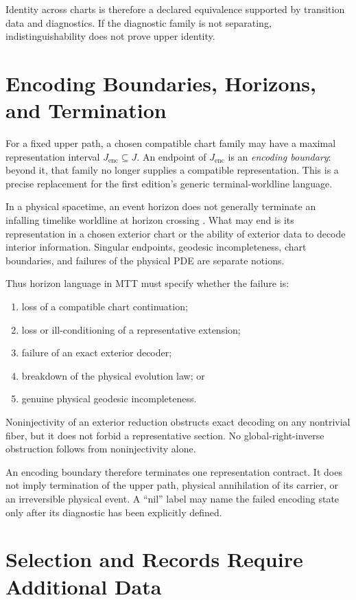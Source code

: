 \documentclass[11pt]{article}
\begin{document}
Identity across charts is therefore a declared equivalence supported by
transition data and diagnostics. If the diagnostic family is not separating,
indistinguishability does not prove upper identity.

\section{Encoding Boundaries, Horizons, and Termination}

For a fixed upper path, a chosen compatible chart family may have a maximal
representation interval $J_{\mathrm{enc}}\subseteq J$. An endpoint of
$J_{\mathrm{enc}}$ is an \emph{encoding boundary}: beyond it, that family no
longer supplies a compatible representation. This is a precise replacement
for the first edition's generic terminal-worldline language.

In a physical spacetime, an event horizon does not generally terminate an
infalling timelike worldline at horizon crossing \cite{Wald}. What may end is
its representation in a chosen exterior chart or the ability of exterior data
to decode interior information. Singular endpoints, geodesic incompleteness,
chart boundaries, and failures of the physical PDE are separate notions.

Thus horizon language in MTT must specify whether the failure is:
\begin{enumerate}
\item loss of a compatible chart continuation;
\item loss or ill-conditioning of a representative extension;
\item failure of an exact exterior decoder;
\item breakdown of the physical evolution law; or
\item genuine physical geodesic incompleteness.
\end{enumerate}

Noninjectivity of an exterior reduction obstructs exact decoding on any
nontrivial fiber, but it does not forbid a representative section. No
global-right-inverse obstruction follows from noninjectivity alone.

An encoding boundary therefore terminates one representation contract. It does
not imply termination of the upper path, physical annihilation of its carrier,
or an irreversible physical event. A ``nil'' label may name the failed
encoding state only after its diagnostic has been explicitly defined.

\section{Selection and Records Require Additional Data}
\end{document}
